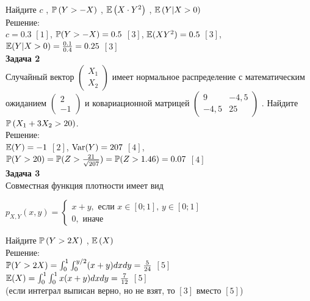 \documentclass[12pt, a4paper]{article}\usepackage[]{graphicx}\usepackage[]{color}
\begin{document}
	Найдите  $c$ ,  $\P\left(Y>-X\right)$ ,  $\E\left(X\cdot Y^{2}
	\right)$ ,  $\E\left(Y|X>0\right)$ \\
	Решение: \\
	$c=0.3$ $[1]$, $\P(Y>-X)=0.5$ $[3]$, $\E(XY^{2})=0.5$ $[3]$,
	$\E(Y|X>0)=\frac{0.1}{0.4}=0.25$ $[3]$ \\

	\textbf{Задача 2} \\ %
	Случайный вектор  $\left(\begin{array}{c}
	{X_{1} } \\ {X_{2} }
	\end{array}\right)$  имеет нормальное распределение с
	математическим ожиданием  $\left(\begin{array}{c} {2} \\ {-1}
	\end{array}\right)$  и ковариационной матрицей
	$\left(\begin{array}{cc} {9} & {-4,5} \\ {-4,5} & {25}
	\end{array}\right)$ . Найдите  $\P\left(X_{1} +3X_{2} >20\right)$.
	\\
	Решение: \\
	$\E(Y)=-1$ $[2]$, $\Var(Y)=207$ $[4]$,
	$\P(Y>20)=\P(Z>\frac{21}{\sqrt{207}})=\P(Z>1.46)=0.07$ $[4]$ \\

	\textbf{Задача 3} \\ %
	Совместная функция плотности имеет вид

	$p_{X,Y} \left(x,y\right)=\left\{\begin{array}{l} {x+y,
		\text{ если } x\in \left[0;1\right],\, y\in \left[0;1\right]} \\
	{0,\text{ иначе} } \end{array}\right. $

	Найдите  $\P\left(Y>2X\right)$ ,  $\E\left(X\right)$ \\
	Решение: \\
	$\P(Y>2X)=\int_{0}^{1}\int_{0}^{y/2}(x+y)dxdy=\frac{5}{24}$ $[5]$\\
	$\E(X)=\int_{0}^{1}\int_{0}^{1}x(x+y)dxdy=\frac{7}{12}$ $[5]$\\
	(если интеграл выписан верно, но не взят, то $[3]$ вместо $[5]$)
	\\
\end{document}

